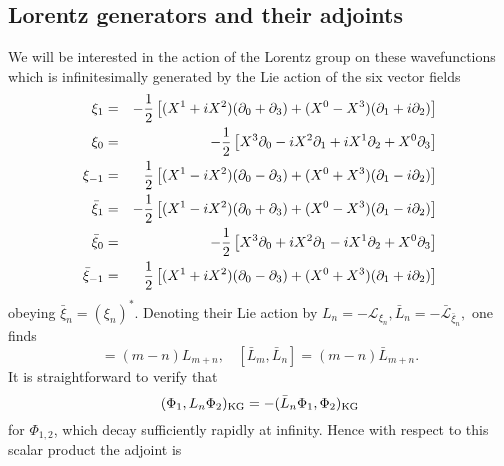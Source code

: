 \documentclass[11pt]{article}
\numberwithin{equation}{section}
\begin{document}
\subsection{Lorentz generators and their adjoints}
We will be interested in the action of the Lorentz group on these wavefunctions which is infinitesimally generated by the Lie action of the six vector fields
\begin{eqnarray}
\xi_1 & = & -\frac{1}{2}\left[(X^1+iX^2)(\partial_0+\partial_3) +(X^0-X^3)(\partial_1+i\partial_2)\right] \cr
\xi_0  & = & -\frac{1}{2}\left[X^3\partial_0 - i X^2\partial_1+iX^1\partial_2+X^0\partial_3\right]\cr
\xi_{-1}  & = &\frac{1}{2}\left[(X^1-iX^2)(\partial_0-\partial_3) + (X^0+X^3)(\partial_1-i\partial_2)\right]\cr
\bar\xi_1 & = & -\frac{1}{2}\left[(X^1-iX^2)(\partial_0+\partial_3) +(X^0-X^3)(\partial_1-i\partial_2)\right] \cr
\bar\xi_0  & = & -\frac{1}{2}\left[X^3\partial_0 + i X^2\partial_1-iX^1\partial_2+X^0\partial_3\right]\cr
\bar\xi_{-1}  & = &\frac{1}{2}\left[(X^1+iX^2)(\partial_0-\partial_3) + (X^0+X^3)(\partial_1+i\partial_2)\right] 
\end{eqnarray}
obeying $\bar{\xi}_n = (\xi_n)^\ast$. Denoting their Lie action by  $ L_n = -\mathcal{L}_{\xi_n}, \bar{L}_n = -\bar{\mathcal{L}}_{\bar{\xi}_n}, $ one finds 
\begin{equation}
[ L_m, L_n]=(m-n) L_{m+n},~~~~ [\bar{L}_m,\bar{L}_n]=(m-n)\bar{L}_{m+n}.
\end{equation}
It is straightforward to verify that~\cite{Bousso:2001mw}
\begin{equation}
(\Phi_1,L_n\Phi_2)_{\rm{KG}} = -(\bar{L}_n\Phi_1,\Phi_2)_{\rm{KG}}
\end{equation}
for $\Phi_{1,2}$, which decay sufficiently rapidly at infinity. Hence with respect to this scalar product the adjoint is 
\end{document}
